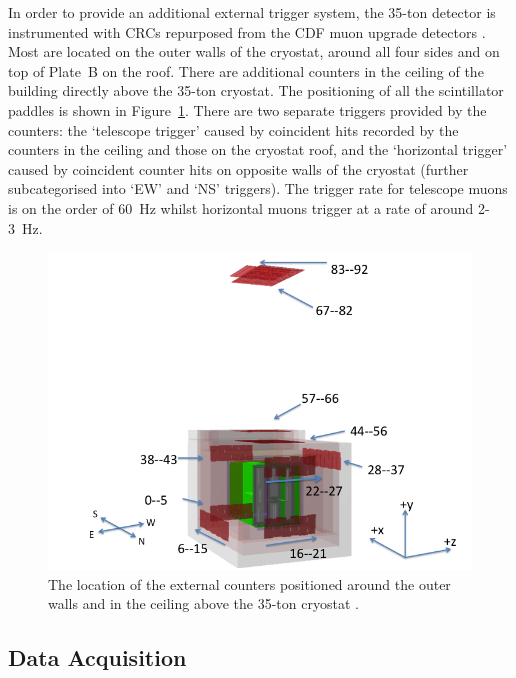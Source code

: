 In order to provide an additional external trigger system, the 35-ton detector is instrumented with CRCs repurposed from the CDF muon upgrade detectors \cite{CDFCounters2005}.  Most are located on the outer walls of the cryostat, around all four sides and on top of Plate~B on the roof.  There are additional counters in the ceiling of the building directly above the 35-ton cryostat.  The positioning of all the scintillator paddles is shown in Figure~\ref{fig:35tonExternalCounters}.  There are two separate triggers provided by the counters: the `telescope trigger' caused by coincident hits recorded by the counters in the ceiling and those on the cryostat roof, and the `horizontal trigger' caused by coincident counter hits on opposite walls of the cryostat (further subcategorised into `EW' and `NS' triggers).  The trigger rate for telescope muons is on the order of 60~Hz whilst horizontal muons trigger at a rate of around 2-3~Hz.

\begin{figure}
  \centering
  \includegraphics[width=12cm]{35tonExternalCounters.png}
  \caption[The location of the external counters positioned around the outer walls and in the ceiling above the 35-ton cryostat.]{The location of the external counters positioned around the outer walls and in the ceiling above the 35-ton cryostat \cite{35tonExternalCounters}.}
  \label{fig:35tonExternalCounters}
\end{figure}

\subsection{Data Acquisition}\label{sec:35tonDataAcquisition}

